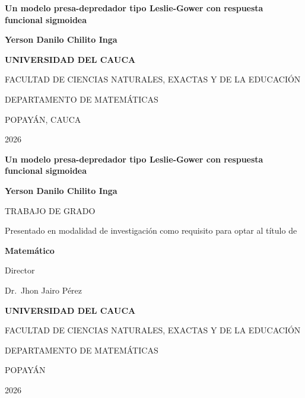 \newcommand{\tituloTrabajo}{Un modelo presa-depredador tipo Leslie-Gower con respuesta funcional sigmoidea}
\newcommand{\nombreAutor}{Yerson Danilo Chilito Inga}
\newcommand{\nombreDirector}{Jhon Jairo Pérez}
\newcommand{\tituloDirector}{Dr.}
\newcommand{\modalidad}{investigación}
\newcommand{\tituloOptar}{Matemático}
\newcommand{\anioTrabajo}{2026}
\newcommand{\ciudadTrabajo}{POPAYÁN}

\thispagestyle{empty}
\begin{center}
	\centering
	\vspace*{1cm}
	
	{\Large \textbf{\tituloTrabajo}\par}
	
	\vspace{6cm}
	
	{\large \textbf{\nombreAutor}\par}
	
	\vfill
	
	{\large \textbf{UNIVERSIDAD DEL CAUCA}\par}
	{\large FACULTAD DE CIENCIAS NATURALES, EXACTAS Y DE LA EDUCACIÓN\par}
	{\large DEPARTAMENTO DE MATEMÁTICAS\par}
	{\large \ciudadTrabajo, CAUCA\par}
	{\large \anioTrabajo\par}
\end{center}

\newpage
\thispagestyle{empty}
\begin{center}
	\vspace*{1cm}
	{\Large \textbf{\tituloTrabajo}\par}
	
	\vspace{3cm}
	
	{\large \textbf{\nombreAutor}\par}
	
	\vfill
	
	{\large TRABAJO DE GRADO\par}
	\vspace{0.5cm}
	{\normalsize Presentado en modalidad de investigación como requisito para optar al título de\par}
	{\large \textbf{\tituloOptar}\par}
	
	\vspace{2cm}
	
	{\large Director\par}
	{\large \tituloDirector\ \nombreDirector\par}
	
	\vfill
	
	{\large \textbf{UNIVERSIDAD DEL CAUCA}\par}
	{\large FACULTAD DE CIENCIAS NATURALES, EXACTAS Y DE LA EDUCACIÓN\par}
	{\large DEPARTAMENTO DE MATEMÁTICAS\par}
	{\large \ciudadTrabajo\par}
	{\large \anioTrabajo\par}
\end{center}